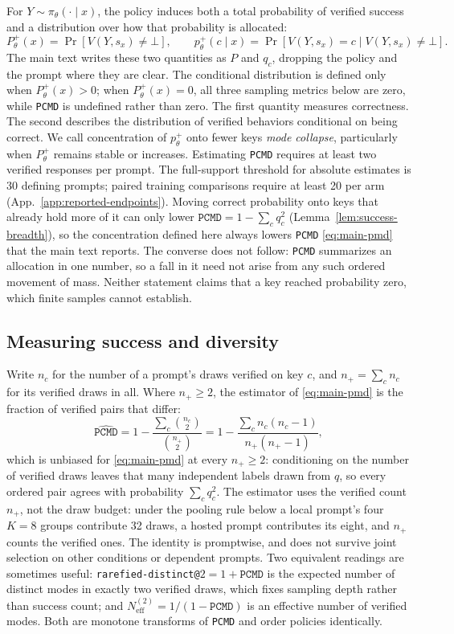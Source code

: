 \documentclass{article}
\newcommand{\1}{\mathbf 1}
\newcommand{\pmd}{\texttt{PCMD}}
\newcommand{\neff}{\ensuremath{N^{(2)}_{\mathrm{eff}}}}
\theoremstyle{remark}
\theoremstyle{definition}
\theoremstyle{plain}
\begin{document}
For $Y\sim\pi_\theta(\cdot\mid x)$, the policy induces both a total probability
of verified success and a distribution over how that probability is allocated:
\[
 P_\theta^+(x)=\Pr[V(Y,s_x)\neq\bot],
 \qquad
 p_\theta^+(c\mid x)=\Pr[V(Y,s_x)=c\mid V(Y,s_x)\neq\bot].
\]
The main text writes these two quantities as $P$ and $q_c$, dropping the
policy and the prompt where they are clear.
The conditional distribution is defined only when $P_\theta^+(x)>0$;
when $P_\theta^+(x)=0$, all three sampling metrics below are zero, while
\pmd{} is undefined rather than zero.
The first quantity measures correctness. The second describes the distribution
of verified behaviors conditional on being correct. We call concentration of
$p_\theta^+$ onto fewer keys \emph{mode collapse}, particularly when
$P_\theta^+$ remains stable or increases. Estimating \pmd{} requires at
least two verified responses per prompt. The full-support threshold for
absolute estimates is 30 defining prompts; paired training comparisons
require at least 20 per arm
(App.~\ref{app:reported-endpoints}).
Moving correct probability onto keys that already hold more of it can only
lower $\pmd{}=1-\sum_c q_c^2$ (Lemma~\ref{lem:success-breadth}), so the
concentration defined here always lowers \pmd{}
\eqref{eq:main-pmd} that the main text reports. The converse does not follow:
\pmd{} summarizes an allocation in one number, so a fall in it need not arise
from any such ordered movement of mass. Neither statement claims that a key
reached probability zero, which finite samples cannot establish.

\subsection{Measuring success and diversity}
\label{app:metric-sampling}

Write $n_c$ for the number of a prompt's draws verified on key $c$, and
$n_+=\sum_c n_c$ for its verified draws in all. Where $n_+\ge2$, the estimator
of \eqref{eq:main-pmd} is the fraction of verified pairs that differ:
\begin{equation}
 \widehat{\pmd}
 =1-\frac{\sum_c \binom{n_c}{2}}{\binom{n_+}{2}}
 =1-\frac{\sum_c n_c(n_c-1)}{n_+(n_+-1)},
 \label{eq:main-pmd-estimator}
\end{equation}
which is unbiased for \eqref{eq:main-pmd} at every $n_+\ge2$: conditioning on
the number of verified draws leaves that many independent labels drawn from
$q$, so every ordered pair agrees with probability $\sum_c q_c^2$. The
estimator uses the verified count $n_+$, not the draw budget: under the
pooling rule below a local prompt's four $K=8$ groups contribute 32 draws, a
hosted prompt contributes its eight, and $n_+$ counts the verified ones. The
identity is promptwise, and does not survive joint selection on other
conditions or dependent prompts. Two equivalent readings are sometimes useful:
\texttt{rarefied-distinct@}$2=1+\pmd$ is the expected number of distinct modes
in exactly two verified draws, which fixes sampling depth rather than success
count; and $\neff=1/(1-\pmd)$ is an effective number of verified modes. Both
are monotone transforms of \pmd{} and order policies identically.
\end{document}
